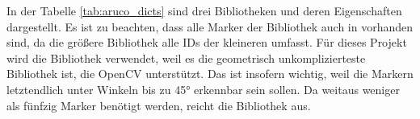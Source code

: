 In der Tabelle \autoref{tab:aruco_dicts} sind drei Bibliotheken und deren Eigenschaften dargestellt. Es ist zu beachten, dass alle Marker der Bibliothek  auch in  vorhanden sind, da die größere Bibliothek alle IDs der kleineren umfasst. Für dieses Projekt wird die Bibliothek  verwendet, weil es die geometrisch unkomplizierteste Bibliothek ist, die OpenCV unterstützt. Das ist insofern wichtig, weil die Markern letztendlich unter Winkeln bis zu 45° erkennbar sein sollen. Da weitaus weniger als fünfzig Marker benötigt werden, reicht die  Bibliothek aus.

\endgroup
